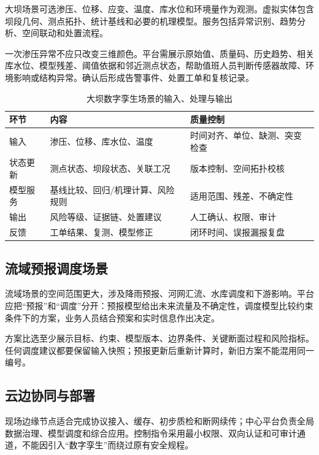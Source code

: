 大坝场景可选渗压、位移、应变、温度、库水位和环境量作为观测。虚拟实体包含坝段几何、测点拓扑、统计基线和必要的机理模型。服务包括异常识别、趋势分析、空间联动和处置流程。

一次渗压异常不应只改变三维颜色。平台需展示原始值、质量码、历史趋势、相关库水位、模型残差、阈值依据和邻近测点状态，帮助值班人员判断传感器故障、环境影响或结构异常。确认后形成告警事件、处置工单和复核记录。

\begin{table}[htbp]
\centering
\caption{大坝数字孪生场景的输入、处理与输出}
\label{tab:dam-twin-scenario}
\begin{tabular}{p{3.1cm}p{4.5cm}p{5.2cm}}
\toprule
环节 & 内容 & 质量控制 \\
\midrule
输入 & 渗压、位移、库水位、温度 & 时间对齐、单位、缺测、突变检查 \\
状态更新 & 测点状态、坝段状态、关联工况 & 版本控制、空间拓扑校核 \\
模型服务 & 基线比较、回归/机理计算、风险规则 & 适用范围、残差、不确定性 \\
输出 & 风险等级、证据链、处置建议 & 人工确认、权限、审计 \\
反馈 & 工单结果、复测、模型修正 & 闭环时间、误报漏报复盘 \\
\bottomrule
\end{tabular}
\end{table}

\subsection{流域预报调度场景}

流域场景的空间范围更大，涉及降雨预报、河网汇流、水库调度和下游影响。平台应把“预报”和“调度”分开：预报模型给出未来流量及不确定性，调度模型比较约束条件下的方案，业务人员结合预案和实时信息作出决定。

方案比选至少展示目标、约束、模型版本、边界条件、关键断面过程和风险指标。任何调度建议都要保留输入快照；预报更新后重新计算时，新旧方案不能混用同一编号。

\subsection{云边协同与部署}

现场边缘节点适合完成协议接入、缓存、初步质检和断网续传；中心平台负责全局数据治理、模型调度和综合应用。控制指令采用最小权限、双向认证和可审计通道，不能因引入“数字孪生”而绕过原有安全规程。

